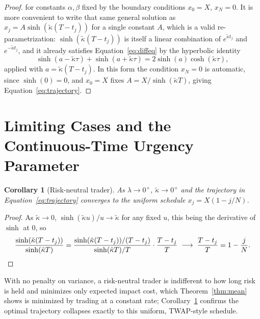 \documentclass[11pt]{article}
\newtheorem{corollary}{Corollary}
\theoremstyle{remark}
\theoremstyle{definition}
\begin{document}
\begin{proof}
for constants $\alpha,\beta$ fixed by the boundary conditions $x_0=X$, $x_N=0$. It is more convenient to write that same general solution as $x_j=A\sinh(\tilde\kappa(T-t_j))$ for a single constant $A$, which is a valid re-parametrization: $\sinh(\tilde\kappa(T-t_j))$ is itself a linear combination of $e^{\tilde\kappa t_j}$ and $e^{-\tilde\kappa t_j}$, and it already satisfies Equation~\eqref{eq:diffeq} by the hyperbolic identity
\begin{equation*}
\sinh(a-\tilde\kappa\tau)+\sinh(a+\tilde\kappa\tau) = 2\sinh(a)\cosh(\tilde\kappa\tau),
\end{equation*}
applied with $a=\tilde\kappa(T-t_j)$. In this form the condition $x_N=0$ is automatic, since $\sinh(0)=0$, and $x_0=X$ fixes $A=X/\sinh(\tilde\kappa T)$, giving Equation~\eqref{eq:trajectory}.
\end{proof}

\section{Limiting Cases and the Continuous-Time Urgency Parameter}
\label{sec:limits}

\begin{corollary}[Risk-neutral trader]
\label{cor:riskneutral}
As $\lambda\to0^+$, $\tilde\kappa\to0^+$ and the trajectory in Equation~\eqref{eq:trajectory} converges to the uniform schedule $x_j = X(1-j/N)$.
\end{corollary}
\begin{proof}
As $\tilde\kappa\to0$, $\sinh(\tilde\kappa u)/u \to \tilde\kappa$ for any fixed $u$, this being the derivative of $\sinh$ at $0$, so
\begin{equation*}
\frac{\sinh(\tilde\kappa(T-t_j))}{\sinh(\tilde\kappa T)}
= \frac{\sinh(\tilde\kappa(T-t_j))/(T-t_j)}{\sinh(\tilde\kappa T)/T}\cdot\frac{T-t_j}{T}
\;\longrightarrow\; \frac{T-t_j}{T} = 1-\frac{j}{N}. \qedhere
\end{equation*}
\end{proof}

With no penalty on variance, a risk-neutral trader is indifferent to how long risk is held and minimizes only expected impact cost, which Theorem~\ref{thm:mean} shows is minimized by trading at a constant rate; Corollary~\ref{cor:riskneutral} confirms the optimal trajectory collapses exactly to this uniform, TWAP-style schedule.
\end{document}
